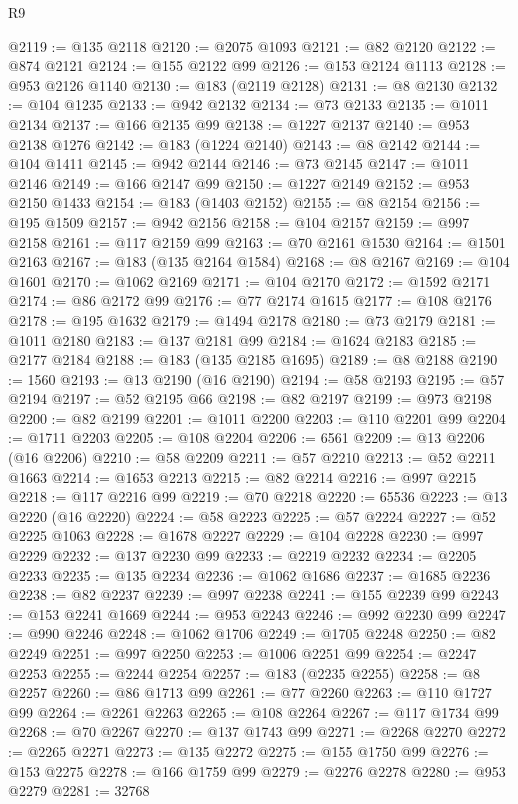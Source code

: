 \begin{lexlean}{R9}
\begin{coremodule}
@2119 := @135 @2118
@2120 := @2075 @1093
@2121 := @82 @2120
@2122 := @874 @2121
@2124 := @155 @2122 @99
@2126 := @153 @2124 @1113
@2128 := @953 @2126 @1140
@2130 := @183 (@2119 @2128)
@2131 := @8 @2130
@2132 := @104 @1235
@2133 := @942 @2132
@2134 := @73 @2133
@2135 := @1011 @2134
@2137 := @166 @2135 @99
@2138 := @1227 @2137
@2140 := @953 @2138 @1276
@2142 := @183 (@1224 @2140)
@2143 := @8 @2142
@2144 := @104 @1411
@2145 := @942 @2144
@2146 := @73 @2145
@2147 := @1011 @2146
@2149 := @166 @2147 @99
@2150 := @1227 @2149
@2152 := @953 @2150 @1433
@2154 := @183 (@1403 @2152)
@2155 := @8 @2154
@2156 := @195 @1509
@2157 := @942 @2156
@2158 := @104 @2157
@2159 := @997 @2158
@2161 := @117 @2159 @99
@2163 := @70 @2161 @1530
@2164 := @1501 @2163
@2167 := @183 (@135 @2164 @1584)
@2168 := @8 @2167
@2169 := @104 @1601
@2170 := @1062 @2169
@2171 := @104 @2170
@2172 := @1592 @2171
@2174 := @86 @2172 @99
@2176 := @77 @2174 @1615
@2177 := @108 @2176
@2178 := @195 @1632
@2179 := @1494 @2178
@2180 := @73 @2179
@2181 := @1011 @2180
@2183 := @137 @2181 @99
@2184 := @1624 @2183
@2185 := @2177 @2184
@2188 := @183 (@135 @2185 @1695)
@2189 := @8 @2188
@2190 := 1560
@2193 := @13 @2190 (@16 @2190)
@2194 := @58 @2193
@2195 := @57 @2194
@2197 := @52 @2195 @66
@2198 := @82 @2197
@2199 := @973 @2198
@2200 := @82 @2199
@2201 := @1011 @2200
@2203 := @110 @2201 @99
@2204 := @1711 @2203
@2205 := @108 @2204
@2206 := 6561
@2209 := @13 @2206 (@16 @2206)
@2210 := @58 @2209
@2211 := @57 @2210
@2213 := @52 @2211 @1663
@2214 := @1653 @2213
@2215 := @82 @2214
@2216 := @997 @2215
@2218 := @117 @2216 @99
@2219 := @70 @2218
@2220 := 65536
@2223 := @13 @2220 (@16 @2220)
@2224 := @58 @2223
@2225 := @57 @2224
@2227 := @52 @2225 @1063
@2228 := @1678 @2227
@2229 := @104 @2228
@2230 := @997 @2229
@2232 := @137 @2230 @99
@2233 := @2219 @2232
@2234 := @2205 @2233
@2235 := @135 @2234
@2236 := @1062 @1686
@2237 := @1685 @2236
@2238 := @82 @2237
@2239 := @997 @2238
@2241 := @155 @2239 @99
@2243 := @153 @2241 @1669
@2244 := @953 @2243
@2246 := @992 @2230 @99
@2247 := @990 @2246
@2248 := @1062 @1706
@2249 := @1705 @2248
@2250 := @82 @2249
@2251 := @997 @2250
@2253 := @1006 @2251 @99
@2254 := @2247 @2253
@2255 := @2244 @2254
@2257 := @183 (@2235 @2255)
@2258 := @8 @2257
@2260 := @86 @1713 @99
@2261 := @77 @2260
@2263 := @110 @1727 @99
@2264 := @2261 @2263
@2265 := @108 @2264
@2267 := @117 @1734 @99
@2268 := @70 @2267
@2270 := @137 @1743 @99
@2271 := @2268 @2270
@2272 := @2265 @2271
@2273 := @135 @2272
@2275 := @155 @1750 @99
@2276 := @153 @2275
@2278 := @166 @1759 @99
@2279 := @2276 @2278
@2280 := @953 @2279
@2281 := 32768

\end{coremodule}
\end{lexlean}
